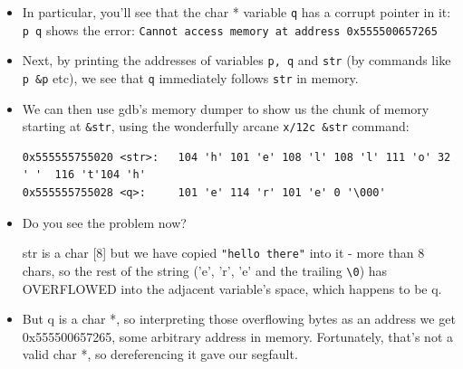 \documentclass[handout]{beamer}
\newcommand{\pitem}{\pause \item}
\begin{document}
\begin{frame}[fragile]
    \begin{itemize}
      \item
      In particular, you'll see that the char * variable \verb+q+ has a corrupt pointer in it:
        \verb'p q' shows the error:
	\verb+Cannot access memory at address 0x555500657265+

      \pitem
      Next, by printing the addresses of variables \verb+p, q+ and \verb+str+
      (by commands like \verb+p &p+ etc), we see that \verb+q+
      \alert{immediately follows} \verb+str+ in memory.

      \pitem
      We can then use gdb's \alert{memory dumper} to show us the chunk of memory
      starting at \verb+&str+, using the wonderfully arcane \verb+x/12c &str+ command:

	{\tiny
	\begin{verbatim}
0x555555755020 <str>:   104 'h' 101 'e' 108 'l' 108 'l' 111 'o' 32 ' '  116 't'104 'h'
0x555555755028 <q>:     101 'e' 114 'r' 101 'e' 0 '\000'
	\end{verbatim}
	}

      \item
      Do you see the problem now?

      \pause
      str is a \alert{char [8]} but we have copied \verb+"hello there"+
      into it - more than 8 chars,
      \pause
      so the rest of the string
      ('e', 'r', 'e' and the trailing \verb+\0+)
      has OVERFLOWED into the adjacent variable's space, which happens to be
      \alert{q}.

      \pitem
      But q is a char *, so interpreting those overflowing bytes as an address we get
      0x555500657265, some arbitrary address in memory.
      Fortunately, that's not a valid char *, so dereferencing it gave our segfault.

    \end{itemize}
\end{frame}
\end{document}
